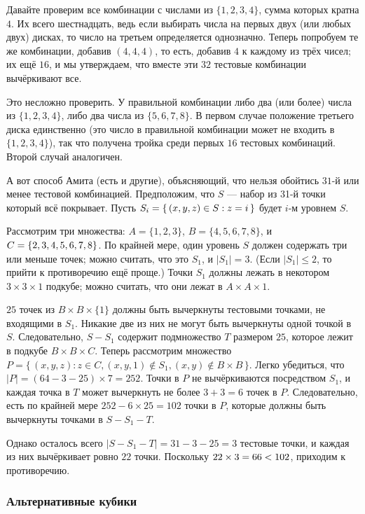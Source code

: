 Давайте проверим все комбинации с числами из $\{1, 2, 3, 4\}$, сумма которых кратна $4$.
Их всего шестнадцать, ведь если выбирать числа на первых двух (или любых двух) дисках, то число на третьем определяется однозначно.
Теперь попробуем те же комбинации, добавив $(4,4,4)$, то есть, добавив $4$ к каждому из трёх чисел;
их ещё $16$, и мы утверждаем, что вместе эти $32$ тестовые комбинации вычёркивают все.

Это несложно проверить.
У правильной комбинации либо два (или более) числа из $\{1, 2, 3, 4\}$, либо два числа из  $\{5, 6, 7, 8\}$.
В первом случае положение третьего диска единственно (это число в правильной комбинации может не входить в $\{1, 2, 3, 4\}$), так что получена тройка среди первых $16$ тестовых комбинаций.
Второй случай аналогичен.

А вот способ Амита (есть и другие), объясняющий, что нельзя обойтись $31$-й или менее тестовой комбинацией.
Предположим, что $S$ --- набор из 31-й точки который всё покрывает.
Пусть $S_i = \{\,(x, y, z) \z\in S : z = i\,\}$ будет $i$-м уровнем $S$.

Рассмотрим три множества:
$A=\{1, 2, 3\}$,
$B = \{4, 5, 6, 7, 8\}$,
и $C \z= \{2, 3, 4, 5, 6, 7, 8\}$.
По крайней мере, один уровень $S$ должен содержать три или меньше точек;
можно считать, что это $S_1$, и $|S_1| = 3$.
(Если $|S_1| \le 2$, то прийти к противоречию ещё проще.)
Точки $S_1$ должны лежать в некотором $3 \times 3 \times 1$ подкубе;
можно считать, что они лежат в $A \times A \times {1}$.

$25$ точек из $B \times B \times \{1\}$ должны быть вычеркнуты тестовыми точками, не входящими в $S_1$.
Никакие две из них не могут быть вычеркнуты одной точкой в $S$.
Следовательно, $S - S_1$ содержит подмножество $T$ размером $25$, которое лежит в подкубе $B \times B \times C$.
Теперь рассмотрим множество $P = \{\,(x, y, z) : z \in C, (x, y, 1) \notin S_1 , (x, y) \notin B \times B\,\}$.
Легко убедиться, что $|P| = (64-3-25) \times 7 = 252$.
Точки в $P$ не вычёркиваются посредством $S_1$, и каждая точка в $T$ может вычеркнуть не более $3 + 3 = 6$ точек в $P$. Следовательно, есть по крайней мере $252 - 6 \times 25 = 102$ точки в $P$, которые должны быть вычеркнуты точками в $S - S_1 - T$.

Однако осталось всего $|S - S_1 - T | = 31 - 3 - 25 = 3$ тестовые точки, и каждая из них вычёркивает ровно $22$ точки.
Поскольку $22 \times 3 = 66 \z< 102$, приходим к противоречию. 

\subsubsection*{Альтернативные кубики}

